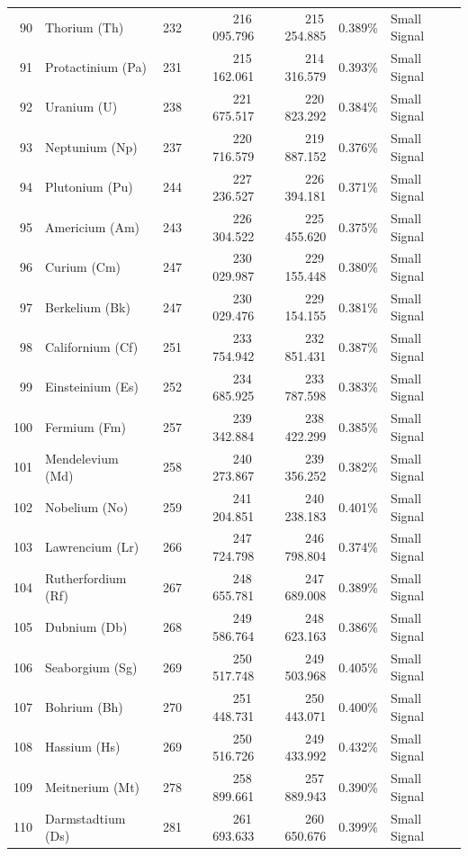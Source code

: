 \begin{small}
\begin{longtable}{r l r r r r l}
90 & Thorium (Th)      & 232 & 216\,095.796 & 215\,254.885 & 0.389\% & Small Signal \\
91 & Protactinium (Pa) & 231 & 215\,162.061 & 214\,316.579 & 0.393\% & Small Signal \\
92 & Uranium (U)       & 238 & 221\,675.517 & 220\,823.292 & 0.384\% & Small Signal \\
93 & Neptunium (Np)    & 237 & 220\,716.579 & 219\,887.152 & 0.376\% & Small Signal \\
94 & Plutonium (Pu)    & 244 & 227\,236.527 & 226\,394.181 & 0.371\% & Small Signal \\
95 & Americium (Am)    & 243 & 226\,304.522 & 225\,455.620 & 0.375\% & Small Signal \\
96 & Curium (Cm)       & 247 & 230\,029.987 & 229\,155.448 & 0.380\% & Small Signal \\
97 & Berkelium (Bk)    & 247 & 230\,029.476 & 229\,154.155 & 0.381\% & Small Signal \\
98 & Californium (Cf)  & 251 & 233\,754.942 & 232\,851.431 & 0.387\% & Small Signal \\
99 & Einsteinium (Es)  & 252 & 234\,685.925 & 233\,787.598 & 0.383\% & Small Signal \\
100 & Fermium (Fm)     & 257 & 239\,342.884 & 238\,422.299 & 0.385\% & Small Signal \\
101 & Mendelevium (Md) & 258 & 240\,273.867 & 239\,356.252 & 0.382\% & Small Signal \\
102 & Nobelium (No)    & 259 & 241\,204.851 & 240\,238.183 & 0.401\% & Small Signal \\
103 & Lawrencium (Lr)  & 266 & 247\,724.798 & 246\,798.804 & 0.374\% & Small Signal \\
104 & Rutherfordium (Rf) & 267 & 248\,655.781 & 247\,689.008 & 0.389\% & Small Signal \\
105 & Dubnium (Db)     & 268 & 249\,586.764 & 248\,623.163 & 0.386\% & Small Signal \\
106 & Seaborgium (Sg)  & 269 & 250\,517.748 & 249\,503.968 & 0.405\% & Small Signal \\
107 & Bohrium (Bh)     & 270 & 251\,448.731 & 250\,443.071 & 0.400\% & Small Signal \\
108 & Hassium (Hs)     & 269 & 250\,516.726 & 249\,433.992 & 0.432\% & Small Signal \\
109 & Meitnerium (Mt)  & 278 & 258\,899.661 & 257\,889.943 & 0.390\% & Small Signal \\
110 & Darmstadtium (Ds) & 281 & 261\,693.633 & 260\,650.676 & 0.399\% & Small Signal \\

\end{longtable}
\end{small}
